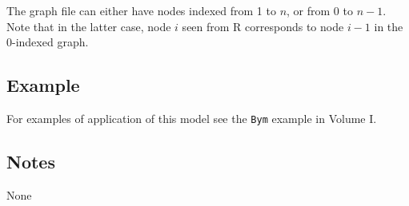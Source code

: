 \documentclass[a4paper,11pt]{article}
\begin{document}
The graph file can either have nodes indexed from 1 to $n$, or from 0
to $n-1$.  Note that in the latter case, node $i$ seen from R
corresponds to node $i-1$ in the 0-indexed graph.

\subsection*{Example}

For examples of application of this model see the {\tt Bym} example in
Volume I.

\subsection*{Notes}

None
\end{document}
